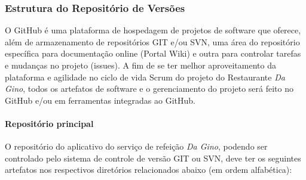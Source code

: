 \subsubsection{Estrutura do Repositório de Versões}

O GitHub é uma plataforma de hospedagem de projetos de software que oferece, além de armazenamento de repositórios GIT e/ou SVN, uma área do repositório específica para documentação online (Portal Wiki) e outra para controlar tarefas e mudanças no projeto (issues). A fim de se ter melhor aproveitamento da plataforma e agilidade no ciclo de vida Scrum do projeto do Restaurante \textit{Da Gino}, todos os artefatos de software e o gerenciamento do projeto será feito no GitHub e/ou em ferramentas integradas ao GitHub.

\paragraph{Repositório principal}

O repositório do aplicativo do serviço de refeição \textit{Da Gino}, podendo ser controlado pelo sistema de controle de versão GIT ou SVN, deve ter os seguintes artefatos nos respectivos diretórios relacionados abaixo (em ordem alfabética):

